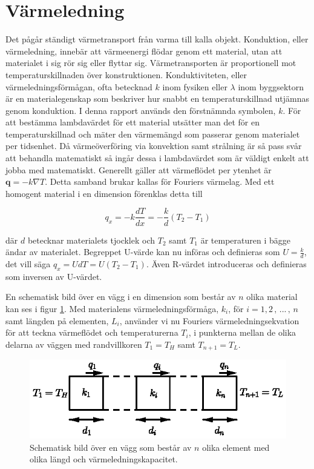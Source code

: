 \section{Värmeledning}\label{sec:heatconduction}

Det pågår ständigt värmetransport från varma till kalla objekt. Konduktion, eller värmeledning, innebär att värmeenergi flödar genom ett material, utan att materialet i sig rör sig eller flyttar sig. Värmetransporten är proportionell mot temperaturskillnaden över konstruktionen. Konduktiviteten, eller värmeledningsförmågan, ofta betecknad $k$ inom fysiken eller $\lambda$ inom byggsektorn är en materialegenskap som beskriver hur snabbt en temperaturskillnad utjämnas genom konduktion. I denna rapport används den förstnämnda symbolen, $k$. För att bestämma lambdavärdet för ett material utsätter man det för en temperaturskillnad och mäter den värmemängd som passerar genom materialet per tidsenhet. Då värmeöverföring via konvektion samt strålning är så pass svår att behandla matematiskt så ingår dessa i lambdavärdet som är väldigt enkelt att jobba med matematiskt. Generellt gäller att värmeflödet per ytenhet är $\mathbf{q} = - k \nabla T$. Detta samband brukar kallas för Fouriers värmelag. Med ett homogent material i en dimension förenklas detta till

\begin{equation}\label{eq:conduction:fourier}\boxed{ \; \; \;
q_x = -k \frac{dT}{dx} = -\frac{k}{d}\left( T_2-T_1\right)
\; \; \; }
\end{equation}

där $d$ betecknar materialets tjocklek och $T_2$ samt $T_1$ är temperaturen i bägge ändar av materialet. Begreppet U-värde kan nu införas och definieras som $U = \frac{k}{d}$, det vill säga $q_x = UdT = U\left( T_2-T_1 \right)$. Även R-värdet introduceras och definieras som inversen av U-värdet.

En schematisk bild över en vägg i en dimension som består av $n$ olika material kan ses i figur \ref{fig:staticwallmethod:wall}. Med materialens värmeledningsförmåga, $k_i$, för $i=1,2\,,\,...\,,\,n$ samt längden på elementen, $L_i$, använder vi nu Fouriers värmeledningsekvation för att teckna värmeflödet och temperaturerna $T_i$, i punkterna mellan de olika delarna av väggen med randvillkoren $T_1 = T_H$ samt $T_{n+1} = T_L$.

\begin{figure}[hpbt]
\centering
\includegraphics{images/wall.eps}
\caption{Schematisk bild över en vägg som består av $n$ olika element med olika
längd och värmeledningskapacitet.}\label{fig:staticwallmethod:wall}
\end{figure}

